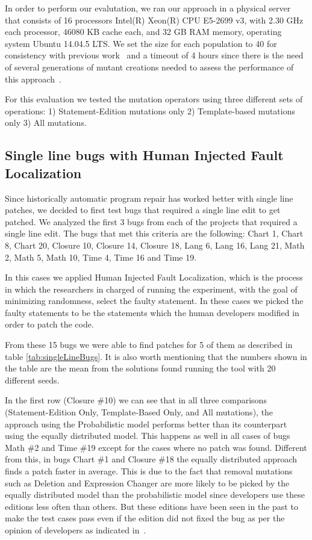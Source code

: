 \documentclass[conference]{IEEEtran}
\begin{document}
In order to perform our evalutation, we ran our approach in a physical server that 
consists of 16 processors Intel(R) Xeon(R) CPU E5-2699 v3, with 2.30 GHz each 
processor, 46080 KB cache each, and 32 GB RAM memory, operating system Ubuntu 
14.04.5 LTS. We set the size for each population to 40 for consistency with 
previous work~\cite{legoues12,kim2013} and a timeout of 4 hours since there is 
the need of several generations of mutant creations needed to assess the 
performance of this approach~\cite{arcuri11}.

For this evaluation we tested the mutation operators using three different sets 
of operations: 1) Statement-Edition mutations only 2) Template-based mutations 
only 3) All mutations.

\subsection{Single line bugs with Human Injected Fault Localization}
Since historically automatic program repair has worked better with single line 
patches, we decided to first test bugs that required a single line edit to get 
patched. We analyzed the first 3 bugs from each of the projects that required a 
single line edit. The bugs that met this criteria are the following: Chart 1, 
Chart 8, Chart 20, Closure 10, Closure 14, Closure 18, Lang 6, Lang 16, Lang 21, 
Math 2, Math 5, Math 10, Time 4, Time 16 and Time 19.

In this cases we applied Human Injected Fault Localization, which is the process in which the researchers in charged of running the experiment, with the goal of minimizing randomness, select the faulty statement. In these cases we picked the faulty statements to be the statements which the human developers modified in order to patch the code.

From these 15 bugs we were able to find patches for 5 of them as described in table \ref{tab:singleLineBugs}. It is also worth mentioning that the numbers shown in the table are the mean from the solutions found running the tool with 20 different seeds. 

In the first row (Closure \#10) we can see that in all three comparisons (Statement-Edition Only, Template-Based Only, and All mutations), the approach using the Probabilistic model performs better than its counterpart using the equally distributed model. This happens as well in all cases of bugs Math \#2 and Time \#19 except for the cases where no patch was found. Different from this, in bugs Chart \#1 and Closure \#18 the equally distributed approach finds a patch faster in average. This is due to the fact that removal mutations such as Deletion and Expression Changer are more likely to be picked by the equally distributed model than the probabilistic model since developers use these editions less often than others. But these editions have been seen in the past to make the test cases pass even if the edition did not fixed the bug as per the opinion of developers as indicated in~\cite{kim2013}.
\end{document}
